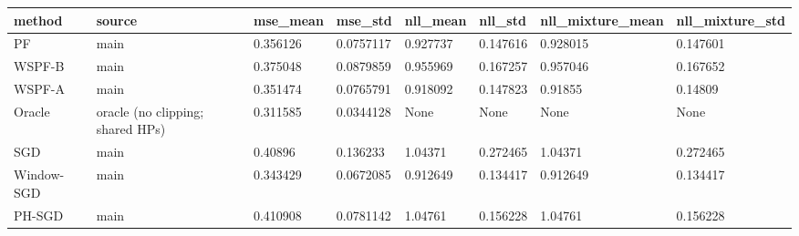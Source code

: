 \begin{tabular}{llllllll}
\hline
method & source & mse\_mean & mse\_std & nll\_mean & nll\_std & nll\_mixture\_mean & nll\_mixture\_std \\
\hline
PF & main & 0.356126 & 0.0757117 & 0.927737 & 0.147616 & 0.928015 & 0.147601 \\
WSPF-B & main & 0.375048 & 0.0879859 & 0.955969 & 0.167257 & 0.957046 & 0.167652 \\
WSPF-A & main & 0.351474 & 0.0765791 & 0.918092 & 0.147823 & 0.91855 & 0.14809 \\
Oracle & oracle (no clipping; shared HPs) & 0.311585 & 0.0344128 & None & None & None & None \\
SGD & main & 0.40896 & 0.136233 & 1.04371 & 0.272465 & 1.04371 & 0.272465 \\
Window-SGD & main & 0.343429 & 0.0672085 & 0.912649 & 0.134417 & 0.912649 & 0.134417 \\
PH-SGD & main & 0.410908 & 0.0781142 & 1.04761 & 0.156228 & 1.04761 & 0.156228 \\
\hline
\end{tabular}
